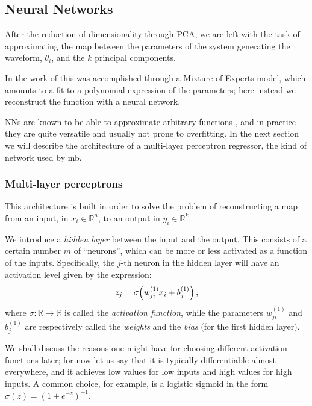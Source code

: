 \documentclass[main.tex]{subfiles}
\begin{document}
\subsection{Neural Networks} \label{sec:neural-network}

After the reduction of dimensionality through \ac{PCA}, we are left with the task of approximating the map between the parameters of the system generating the waveform, \(\theta _i\), and the \(k\) principal components. 

In the work of \textcite[]{schmidtMachineLearningGravitational2020} this was accomplished through a Mixture of Experts model, which amounts to a fit to a polynomial expression of the parameters; here instead we reconstruct the function with a neural network. 

\acsp{NN} are known to be able to approximate arbitrary functions \cite[]{nielsenNeuralNetworksDeep2015}, and in practice they are quite versatile and usually not prone to overfitting. 
In the next section we will describe the architecture of a multi-layer perceptron regressor, the kind of network used by \acs{mb}.

\subsubsection{Multi-layer perceptrons}

This architecture is built in order to solve the problem of reconstructing a map from an input, in \(x_i \in \mathbb{R}^{n}\), to an output in \(y_i \in \mathbb{R}^{k}\).

We introduce a \emph{hidden layer} between the input and the output. 
This consists of a certain number \(m\) of ``neurons'', which can be more or less activated as a function of the inputs.
Specifically, the \(j\)-th neuron in the hidden layer will have an activation level given by the expression: 
%
\begin{align} \label{eq:nn-one-layer}
z_j = \sigma \qty( w^{(1)}_{ji} x_i + b^{(1)}_j)
\,,
\end{align}
%
where \(\sigma \colon \mathbb{R} \to \mathbb{R}\) is called the \emph{activation function}, while the parameters \(w^{(1)}_{ji}\) and \(b^{(1)}_j\) are respectively called the \emph{weights} and the \emph{bias} (for the first hidden layer). 

We shall discuss the reasons one might have for choosing different activation functions later; for now let us say that it is typically differentiable almost everywhere, and it achieves low values for low inputs and high values for high inputs.
A common choice, for example, is a logistic sigmoid in the form \(\sigma (z) = (1 + e^{-z})^{-1}\). 
\end{document}
